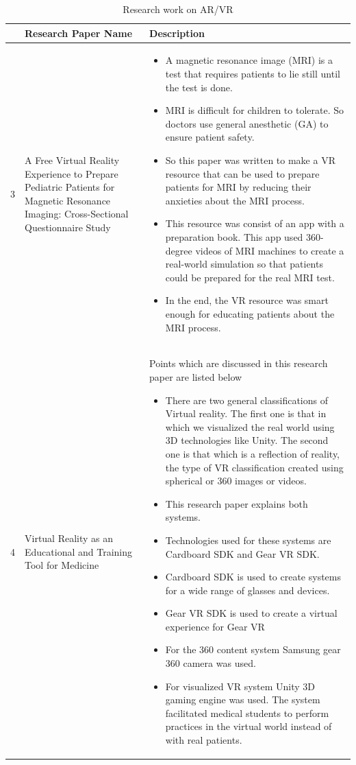 \newpage
\begin{table}[H]
    \centering
\begin{tabular}{ | m{1em} | m{5em} | m{10cm} | } 
 \hline
 \textbf{} & \textbf{Research Paper Name} &
 \textbf{Description}  \\  \hline
           3& A Free Virtual Reality Experience to Prepare Pediatric Patients for Magnetic Resonance Imaging: Cross-Sectional Questionnaire Study & 
           \begin{itemize}
            \item A magnetic resonance image (MRI) is a test that requires patients to lie still until the test is done. 
 \item 	MRI is difficult for children to tolerate. So doctors use general anesthetic (GA) to ensure patient safety. 
 \item 	So this paper was written to make a VR resource that can be used to prepare patients for MRI by reducing their anxieties about the MRI process.
 \item 	This resource was consist of an app with a preparation book. This app used 360-degree videos of MRI machines to create a real-world simulation so that patients could be prepared for the real MRI test.
 \item In the end, the VR resource was smart enough for educating patients about the MRI process.\cite{VRExperienceInMedicalField}
\end{itemize}
       \\  \hline
          4 & Virtual Reality as an Educational and Training Tool for Medicine & Points which are discussed in this research paper are listed below
          \begin{itemize}
 \item 	There are two general classifications of Virtual reality. The first one is that in which we visualized the real world using 3D technologies like Unity. The second one is that which is a reflection of reality, the type of VR classification created using spherical or 360 images or videos. 
 \item 	This research paper explains both systems.
 \item 	Technologies used for these systems are Cardboard SDK and Gear VR SDK. 
 \item 	Cardboard SDK is used to create systems for a wide range of glasses and devices.
 \item 	Gear VR SDK is used to create a virtual experience for Gear VR 
 \item 	For the 360 content system Samsung gear 360 camera was used. 
 \item 	For visualized VR system Unity 3D gaming engine was used.
The system facilitated medical students to perform practices in the virtual world instead of with real patients.\cite{VirtualRealityInEducationandTraining}
\end{itemize}


         \\  \hline
     \end{tabular}
    \caption{Research work on AR/VR}
    \label{Table2.2: Research work on AR/VR}
\end{table}
